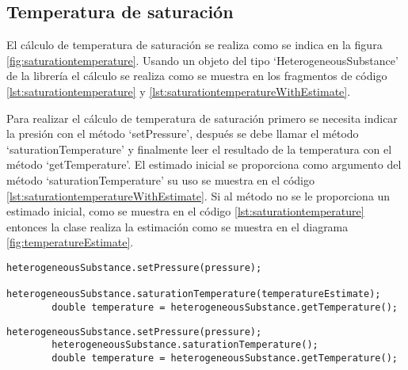 \subsection{Temperatura de saturación}\label{subsec:saturationtemperature}

	El cálculo de temperatura de saturación se realiza como se indica en la figura \ref{fig:saturationtemperature}. Usando un objeto del tipo `HeterogeneousSubstance' de la librería \Materia el cálculo se realiza como se muestra en los fragmentos de código \ref{lst:saturationtemperature} y \ref{lst:saturationtemperatureWithEstimate}.

	Para realizar el cálculo de temperatura de saturación primero se necesita indicar la presión con el método `setPressure', después se debe llamar el método `saturationTemperature' y finalmente leer el resultado de la temperatura con el método `getTemperature'. El estimado inicial se proporciona como argumento del método `saturationTemperature' su uso se muestra en el código \ref{lst:saturationtemperatureWithEstimate}. Si al método no se le proporciona un estimado inicial, como se muestra en el código \ref{lst:saturationtemperature} entonces la clase realiza la estimación como se muestra en el diagrama \ref{fig:temperatureEstimate}. 

	\begin{lstlisting}[label={lst:saturationtemperatureWithEstimate},caption={Cálculo de la temperatura de burbuja proporcionando un estimado inicial.}]
		heterogeneousSubstance.setPressure(pressure);
		heterogeneousSubstance.saturationTemperature(temperatureEstimate);
		double temperature = heterogeneousSubstance.getTemperature();
	\end{lstlisting}


	\begin{lstlisting}[label={lst:saturationtemperature},caption={Cálculo de la temperatura de burbuja.}]
		heterogeneousSubstance.setPressure(pressure);
		heterogeneousSubstance.saturationTemperature();
		double temperature = heterogeneousSubstance.getTemperature();
	\end{lstlisting}

	

